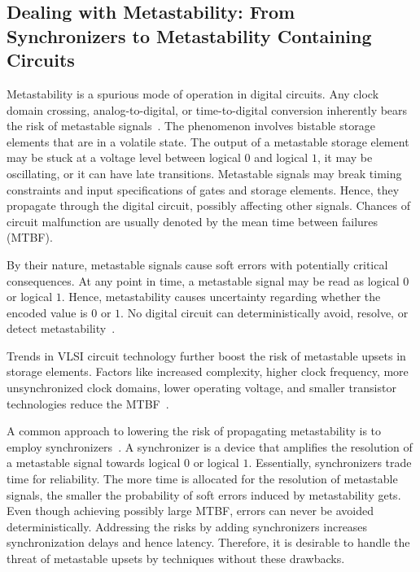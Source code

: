 \documentclass[9pt,journal,compsoc]{IEEEtran}
\theoremstyle{remark}
\begin{document}
\subsection{Dealing with Metastability: From Synchronizers to Metastability Containing Circuits}

Metastability is a spurious mode of operation in digital circuits.
Any clock domain crossing, analog-to-digital, or time-to-digital 
  conversion inherently bears the risk of metastable signals~\cite{ginosar11tutorial}.
The phenomenon involves bistable storage elements that are in a volatile state.
The output of a metastable storage element may be stuck at a voltage level between logical $0$ and
  logical $1$, it may be oscillating, or it can have late transitions. 
Metastable signals may break timing constraints and input specifications of gates
  and storage elements. 
Hence, they propagate through the digital circuit, possibly affecting other signals. 
Chances of circuit malfunction are usually denoted by the mean time between failures (MTBF).

By their nature, metastable signals cause soft errors with potentially critical 
  consequences.
At any point in time, a metastable signal may be read as logical $0$ or logical $1$.
Hence, metastability causes uncertainty regarding whether the encoded value is $0$ or $1$.
No digital circuit 
  can deterministically avoid, resolve, or detect metastability~\cite{marino1977effect}.

Trends in VLSI circuit technology further boost the risk of metastable upsets in storage elements.
Factors like increased complexity, higher clock frequency, more 
  unsynchronized clock domains, lower operating voltage, and smaller
  transistor technologies reduce the MTBF~\cite{ginosar2003fourteen,beer2013metastability}.

A common approach to lowering the risk of propagating metastability is to employ 
  synchronizers~\cite{kinniment08}.
A synchronizer is a device that amplifies the resolution of a metastable signal towards logical $0$
  or logical $1$.
Essentially, synchronizers trade time for reliability. 
The more time is allocated for the resolution of metastable signals, the smaller
  the probability of soft errors induced by metastability gets.
Even though achieving possibly large MTBF, errors 
  can never be avoided deterministically.
Addressing the risks by adding synchronizers increases synchronization
  delays and hence latency.
Therefore, it is desirable to handle the threat of metastable upsets by techniques without these drawbacks.
\end{document}
